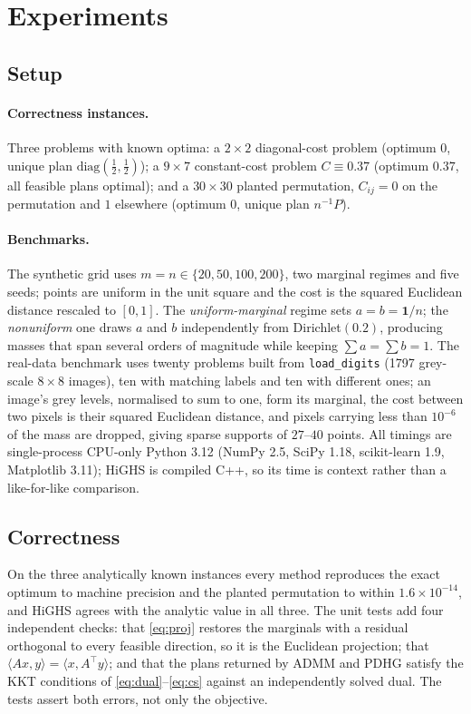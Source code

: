 \documentclass{article}
\newcommand{\Tol}[1]{10^{-#1}}
\begin{document}
\section{Experiments}
\label{sec:experiments}

\subsection{Setup}

\paragraph{Correctness instances.}
Three problems with known optima: a $2\times2$ diagonal-cost problem (optimum $0$,
unique plan $\mathrm{diag}(\tfrac12,\tfrac12)$); a $9\times7$ constant-cost problem
$C\equiv0.37$ (optimum $0.37$, all feasible plans optimal); and a $30\times30$ planted
permutation, $C_{ij}=0$ on the permutation and $1$ elsewhere (optimum $0$, unique plan
$n^{-1}P$).

\paragraph{Benchmarks.}
The synthetic grid uses $m=n\in\{20,50,100,200\}$, two marginal regimes and five seeds;
points are uniform in the unit square and the cost is the squared Euclidean distance
rescaled to $[0,1]$. The \emph{uniform-marginal} regime sets $a=b=\mathbf 1/n$; the
\emph{nonuniform} one draws $a$ and $b$ independently from Dirichlet$(0.2)$, producing
masses that span several orders of magnitude while keeping $\sum a=\sum b=1$. The
real-data benchmark uses twenty problems built from \texttt{load\_digits}
\citep{dua2017uci,pedregosa2011sklearn} (1797 grey-scale $8\times8$ images), ten with
matching labels and ten with different ones; an image's grey levels, normalised to sum to
one, form its marginal, the cost between two pixels is their squared Euclidean distance,
and pixels carrying less than $\Tol{6}$ of the mass are dropped, giving sparse supports of
$27$--$40$ points. All timings are single-process CPU-only Python 3.12 (NumPy 2.5, SciPy
1.18, scikit-learn 1.9, Matplotlib 3.11); HiGHS is compiled C++, so its time is context
rather than a like-for-like comparison.

\subsection{Correctness}

On the three analytically known instances every method reproduces the exact optimum to
machine precision and the planted permutation to within $1.6\times\Tol{14}$, and HiGHS
agrees with the analytic value in all three. The unit tests add four independent checks:
that \eqref{eq:proj} restores the marginals with a residual orthogonal to every feasible
direction, so it is the Euclidean projection; that $\langle Ax,y\rangle=\langle
x,A^\top y\rangle$; and that the plans returned by ADMM and PDHG satisfy the KKT conditions
of \eqref{eq:dual}--\eqref{eq:cs} against an independently solved dual. The tests assert
both errors, not only the objective.
\end{document}
